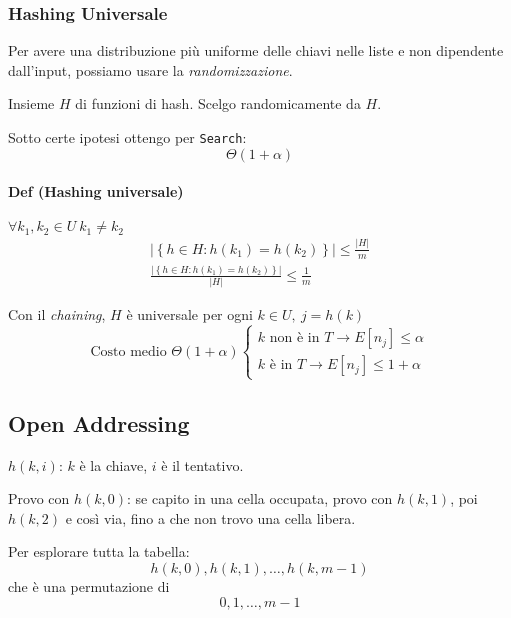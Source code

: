 \subsubsection{Hashing Universale} 
Per avere una distribuzione più uniforme delle chiavi nelle liste e non dipendente dall'input,
possiamo usare la \emph{randomizzazione}. \par
Insieme $H$ di funzioni di hash. Scelgo randomicamente da $H$. \par
Sotto certe ipotesi ottengo per \texttt{Search}:
$$\Theta(1 + \alpha)$$

\paragraph{Def (Hashing universale)} $\forall k_1,k_2 \in U \ k_1 \neq k_2$
\begin{gather*}
	\left| \left\{ h \in H : h(k_1) = h(k_2) \right\} \right| \leq \frac{|H|}{m} \\
	\frac{\left| \left\{ h \in H : h(k_1) = h(k_2) \right\} \right|}{|H|} \leq \frac{1}{m}
\end{gather*}

Con il \emph{chaining}, $H$ è universale per ogni $k \in U, \ j = h(k)$
\[ \text{Costo medio } \Theta(1+\alpha)
	\begin{cases}
		k \text{ non è in } T \rightarrow E[n_j] \leq \alpha \\
		k \text{ è in } T \rightarrow E[n_j] \leq 1 + \alpha
	\end{cases}
\]

\subsection{Open Addressing} \label{hash:openaddessing}

$h(k,i)$: $k$ è la chiave, $i$ è il tentativo.\par
Provo con $h(k,0)$: se capito in una cella occupata, provo con $h(k,1)$, poi $h(k,2)$
e così via, fino a che non trovo una cella libera.

Per esplorare tutta la tabella:
$$h(k,0), h(k,1), \dots, h(k,m-1)$$
che è una permutazione di 
$$0,1,\dots,m-1$$


 

